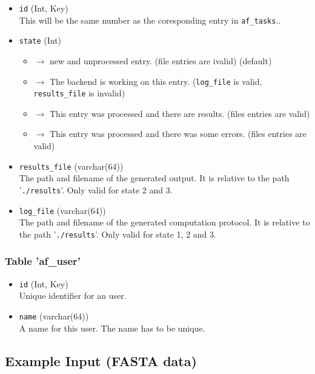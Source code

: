 \documentclass{article}
\begin{document}
\begin{itemize}
\item \texttt{id} (Int, Key) \\
  This will be the same number as the coresponding entry in \texttt{af\_tasks}..

\item \texttt{state} (Int)
  \begin{itemize}
  \item[0] $\to$ new and unprocessed entry. (file entries are ivalid) (default)\\
  \item[1] $\to$ The backend is working on this entry. (\texttt{log\_file} is valid, \texttt{results\_file} is invalid) \\
  \item[2] $\to$ This entry was processed and there are results. (files entries are valid) \\
  \item[3] $\to$ This entry was processed and there was some errors. (files entries are valid)
  \end{itemize}

\item \texttt{results\_file} (varchar(64)) \\
  The path and filename of the generated output. It is relative to the path '\texttt{./results}'.
  Only valid for state 2 and 3.

\item \texttt{log\_file} (varchar(64)) \\
  The path and filename of the generated computation protocol. It is relative to the path '\texttt{./results}'.
  Only valid for state 1, 2 and 3.
\end{itemize}



\subsubsection{Table 'af\_user'}
\begin{itemize}
\item \texttt{id} (Int, Key) \\
  Unique identifier for an user.

\item \texttt{name} (varchar(64)) \\
  A name for this user.
  The name has to be unique.
\end{itemize}


\subsection{Example Input (FASTA data)}\label{ch!example}
\end{document}
